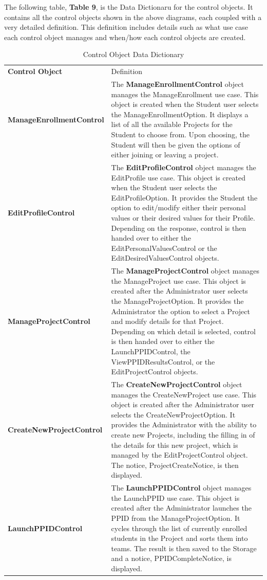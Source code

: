 \documentclass[12pt,letterpaper]{article}
\begin{document}
The following table, {\bf Table 9}, is the Data Dictionaru for the control objects. It contains all the control objects shown in the above diagrams, each coupled with a very detailed definition. 
This definition includes details such as what use case each control object manages and when/how each control objects are created.

\begin{table}[H]
\caption{Control Object Data Dictionary}
	\begin{tabu} to 
		\tableheader{}Control Object & Definition\\
		ManageEnrollmentControl & 
			The {\bf ManageEnrollmentControl} object manages the ManageEnrollment use case. This object is created when the Student user
			selects the ManageEnrollmentOption.  It displays a list of all the available Projects for the Student to choose from. Upon choosing, the
			Student will then be given the options of either joining or leaving a project. \\
		EditProfileControl & 
			The {\bf EditProfileControl} object manages the EditProfile use case. This object is created when the Student user selects the EditProfileOption.
			It provides the Student the option to edit/modify either their personal values or their desired values for their Profile. Depending on the response, control is then
			handed over to either the EditPersonalValuesControl or the EditDesiredValuesControl objects. \\
		ManageProjectControl & 
			The {\bf ManageProjectControl} object manages the ManageProject use case. This object is created after the Administrator user selects the
			ManageProjectOption. It provides the Administrator the option to select a Project and modify details for that Project. Depending on which detail
			is selected, control is then handed over to either the LaunchPPIDControl, the ViewPPIDResultsControl, or the EditProjectControl objects.\\
		CreateNewProjectControl & 
			The {\bf CreateNewProjectControl} object manages the CreateNewProject use case. This object is created after the Administrator user selects the
			CreateNewProjectOption. It provides the Administrator with the ability to create new Projects, including the filling in of the details for this new project,
			which is managed by the EditProjectControl object. The notice, ProjectCreateNotice, is then displayed.\\
		LaunchPPIDControl & 
			The {\bf LaunchPPIDControl} object manages the LaunchPPID use case. This object is created after the Administrator launches the PPID from
			the ManageProjectOption. It cycles through the list of currently enrolled students in the Project and sorts them into teams. The result is then saved
			to the Storage and a notice, PPIDCompleteNotice, is displayed.\\
	\end{tabu}
\end{table}
\end{document}
